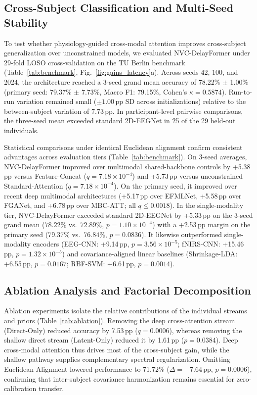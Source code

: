 \documentclass[journal]{IEEEtran}
\begin{document}
\subsection{Cross-Subject Classification and Multi-Seed Stability}

To test whether physiology-guided cross-modal attention improves cross-subject generalization over unconstrained models, we evaluated NVC-DelayFormer under 29-fold LOSO cross-validation on the TU Berlin benchmark (Table~\ref{tab:benchmark}, Fig.~\ref{fig:gains_latency}a). Across seeds 42, 100, and 2024, the architecture reached a 3-seed grand mean accuracy of 78.22\% $\pm$ 1.00\% (primary seed: 79.37\% $\pm$ 7.73\%, Macro F1: 79.15\%, Cohen's $\kappa = 0.5874$). Run-to-run variation remained small ($\pm 1.00$\,pp SD across initializations) relative to the between-subject variation of 7.73\,pp. In participant-level pairwise comparisons, the three-seed mean exceeded standard 2D-EEGNet in 25 of the 29 held-out individuals.

Statistical comparisons under identical Euclidean alignment confirm consistent advantages across evaluation tiers (Table~\ref{tab:benchmark}). On 3-seed averages, NVC-DelayFormer improved over multimodal shared-backbone controls by +5.38\,pp versus Feature-Concat ($q = 7.18\times 10^{-4}$) and +5.73\,pp versus unconstrained Standard-Attention ($q = 7.18\times 10^{-4}$). On the primary seed, it improved over recent deep multimodal architectures (+5.17\,pp over EFMLNet, +5.58\,pp over FGANet, and +6.78\,pp over MBC-ATT; all $q \le 0.0018$). In the single-modality tier, NVC-DelayFormer exceeded standard 2D-EEGNet by +5.33\,pp on the 3-seed grand mean ($78.22\%$ vs.\ $72.89\%$, $p = 1.10\times 10^{-4}$) with a +2.53\,pp margin on the primary seed ($79.37\%$ vs.\ $76.84\%$, $p = 0.0836$). It likewise outperformed single-modality encoders (EEG-CNN: +9.14\,pp, $p = 3.56\times 10^{-5}$; fNIRS-CNN: +15.46\,pp, $p = 1.32\times 10^{-5}$) and covariance-aligned linear baselines (Shrinkage-LDA: +6.55\,pp, $p = 0.0167$; RBF-SVM: +6.61\,pp, $p = 0.0014$).

\subsection{Ablation Analysis and Factorial Decomposition}
Ablation experiments isolate the relative contributions of the individual streams and priors (Table~\ref{tab:ablation}). Removing the deep cross-attention stream (Direct-Only) reduced accuracy by 7.53\,pp ($q = 0.0006$), whereas removing the shallow direct stream (Latent-Only) reduced it by 1.61\,pp ($p = 0.0384$). Deep cross-modal attention thus drives most of the cross-subject gain, while the shallow pathway supplies complementary spectral regularization. Omitting Euclidean Alignment lowered performance to 71.72\% ($\Delta = -7.64$\,pp, $p = 0.0006$), confirming that inter-subject covariance harmonization remains essential for zero-calibration transfer.
\end{document}
